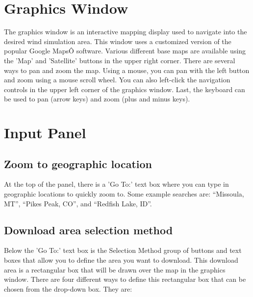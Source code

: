 \documentclass[12pt,oneside,final]{article}
\begin{document}
\section{Graphics Window}

The graphics window is an interactive mapping display used to navigate into the
desired wind simulation area.  This window uses a customized version of the
popular Google MapsÔ software.  Various different base maps are available using
the 'Map' and 'Satellite' buttons in the upper right corner.  There are several
ways to pan and zoom the map.  Using a mouse, you can pan with the left button
and zoom using a mouse scroll wheel.  You can also left-click the navigation
controls in the upper left corner of the graphics window.  Last, the keyboard
can be used to pan (arrow keys) and zoom (plus and minus keys).

\section{Input Panel}

\subsection{Zoom to geographic location}

At the top of the panel, there is a 'Go To:' text box where you can type in
geographic locations to quickly zoom to.  Some example searches are: “Missoula,
MT”, “Pikes Peak, CO”, and “Redfish Lake, ID”.

\subsection{Download area selection method}

Below the 'Go To:' text box is the Selection Method group of buttons and text
boxes that allow you to define the area you want to download.  This download
area is a rectangular box that will be drawn over the map in the graphics
window.  There are four different ways to define this rectangular box that can
be chosen from the drop-down box.  They are:
\end{document}
